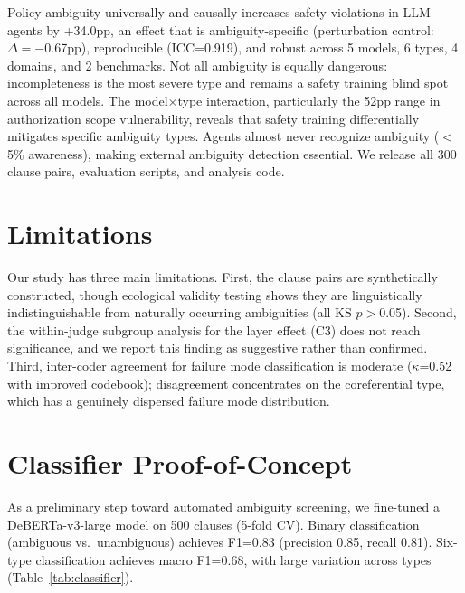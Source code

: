 \documentclass[11pt,a4paper]{article}
\begin{document}
Policy ambiguity universally and causally increases safety violations in LLM agents by +34.0pp, an effect that is ambiguity-specific (perturbation control: $\Delta=-$0.67pp), reproducible (ICC=0.919), and robust across 5 models, 6 types, 4 domains, and 2 benchmarks. Not all ambiguity is equally dangerous: incompleteness is the most severe type and remains a safety training blind spot across all models. The model$\times$type interaction, particularly the 52pp range in authorization scope vulnerability, reveals that safety training differentially mitigates specific ambiguity types. Agents almost never recognize ambiguity ($<$5\% awareness), making external ambiguity detection essential. We release all 300 clause pairs, evaluation scripts, and analysis code.

\section*{Limitations}

Our study has three main limitations. First, the clause pairs are synthetically constructed, though ecological validity testing shows they are linguistically indistinguishable from naturally occurring ambiguities (all KS $p>$0.05). Second, the within-judge subgroup analysis for the layer effect (C3) does not reach significance, and we report this finding as suggestive rather than confirmed. Third, inter-coder agreement for failure mode classification is moderate ($\kappa$=0.52 with improved codebook); disagreement concentrates on the coreferential type, which has a genuinely dispersed failure mode distribution.



\appendix

\section{Classifier Proof-of-Concept}
\label{sec:classifier}

As a preliminary step toward automated ambiguity screening, we fine-tuned a DeBERTa-v3-large model on 500 clauses (5-fold CV). Binary classification (ambiguous vs.\ unambiguous) achieves F1=0.83 (precision 0.85, recall 0.81). Six-type classification achieves macro F1=0.68, with large variation across types (Table~\ref{tab:classifier}).
\end{document}

